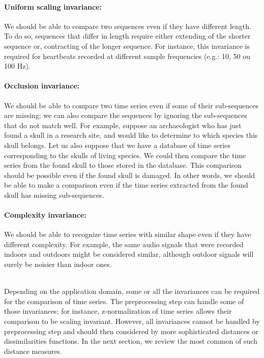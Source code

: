 \paragraph{Uniform scaling invariance:} We should be able to compare two sequences even if they have different length. To do so, sequences that differ in length require either extending of the shorter sequence or, contracting of the longer sequence. For instance, this invariance is required for  heartbeats recorded at different sample frequencies  (e.g.: 10, 50 ou 100 Hz).  

\paragraph{Occlusion invariance:} We should be able to compare two time series even if some of their sub-sequences  are missing; we can also compare the sequences by ignoring the sub-sequences that do not match well.  For example, suppose an archaeologist who has just found a skull in a research site, and  would like to determine to which species this skull belongs. Let us also suppose that we have a database of time series corresponding to the skulls of living species. We could then compare the time series from the found skull to those stored in the database. This comparison should be possible even if the found skull is damaged. In other words, we should be able to make a comparison even if the time series extracted from the found skull has missing sub-sequences.

\paragraph{Complexity invariance:} We should be able to recognize time series with similar shape even if they have different complexity.  For example, the same audio signals that were recorded indoors and outdoors might be considered similar, although outdoor signals will surely be noisier than indoor ones. 


\\

Depending on the application domain, some or all the invariances can be required for the comparison of time series. The preprocessing step can handle some of those invariances; for instance, z-normalization of time series allows their comparison to be scaling invariant. However, all invariances cannot be handled by preprocessing step and should then considered by more sophisticated distances or dissimilarities functions. In the next section, we review the most common of such distance measures.






